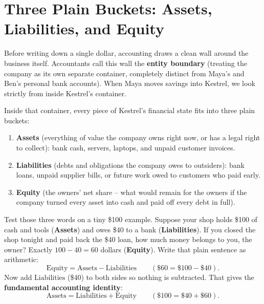 \section{Three Plain Buckets: Assets, Liabilities, and Equity}

Before writing down a single dollar, accounting draws a clean wall around the business itself. Accountants call this wall the \textbf{entity boundary} (treating the company as its own separate container, completely distinct from Maya's and Ben's personal bank accounts). When Maya moves savings into Kestrel, we look strictly from inside Kestrel's container.

Inside that container, every piece of Kestrel's financial state fits into three plain buckets:

\begin{enumerate}
  \item \textbf{Assets} (everything of value the company owns right now, or has a legal right to collect): bank cash, servers, laptops, and unpaid customer invoices.
  \item \textbf{Liabilities} (debts and obligations the company owes to outsiders): bank loans, unpaid supplier bills, or future work owed to customers who paid early.
  \item \textbf{Equity} (the owners' net share -- what would remain for the owners if the company turned every asset into cash and paid off every debt in full).
\end{enumerate}

Test those three words on a tiny \$100 example. Suppose your shop holds \$100 of cash and tools (\textbf{Assets}) and owes \$40 to a bank (\textbf{Liabilities}). If you closed the shop tonight and paid back the \$40 loan, how much money belongs to you, the owner? Exactly $100 - 40 = 60$ dollars (\textbf{Equity}). Write that plain sentence as arithmetic:
\[
  \text{Equity} = \text{Assets} - \text{Liabilities} \qquad (\$60 = \$100 - \$40).
\]
Now add $\text{Liabilities}$ (\$40) to both sides so nothing is subtracted. That gives the \textbf{fundamental accounting identity}:
\begin{equation}
  \label{eq:fundamental-identity}
  \text{Assets} = \text{Liabilities} + \text{Equity} \qquad (\$100 = \$40 + \$60).
\end{equation}

